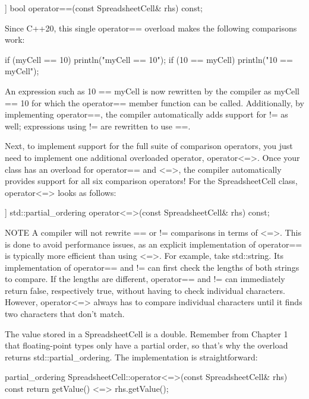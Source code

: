 \begin{cpp}
[[nodiscard]] bool operator==(const SpreadsheetCell& rhs) const;
\end{cpp}

Since C++20, this single operator== overload makes the following comparisons work:

\begin{cpp}
if (myCell == 10) { println("myCell == 10"); }
if (10 == myCell) { println("10 == myCell"); }
\end{cpp}

An expression such as 10 == myCell is now rewritten by the compiler as myCell == 10 for which the operator== member function can be called. Additionally, by implementing operator==, the compiler automatically adds support for != as well; expressions using != are rewritten to use ==.

Next, to implement support for the full suite of comparison operators, you just need to implement one additional overloaded operator, operator<=>. Once your class has an overload for operator== and <=>, the compiler automatically provides support for all six comparison operators! For the SpreadsheetCell class, operator<=> looks as follows:

\begin{cpp}
[[nodiscard]] std::partial_ordering operator<=>(const SpreadsheetCell& rhs) const;
\end{cpp}

\begin{myNotic}{NOTE}
A compiler will not rewrite == or != comparisons in terms of <=>. This is done to avoid performance issues, as an explicit implementation of operator== is typically more efficient than using <=>. For example, take std::string. Its implementation of operator== and != can first check the lengths of both strings to compare. If the lengths are different, operator== and != can immediately return false, respectively true, without having to check individual characters. However, operator<=> always has to compare individual characters until it finds two characters that don’t match.
\end{myNotic}

The value stored in a SpreadsheetCell is a double. Remember from Chapter 1 that floating-point types only have a partial order, so that’s why the overload returns std::partial\_ordering. The implementation is straightforward:

\begin{cpp}
partial_ordering SpreadsheetCell::operator<=>(const SpreadsheetCell& rhs) const
{
    return getValue() <=> rhs.getValue();
}
\end{cpp}

